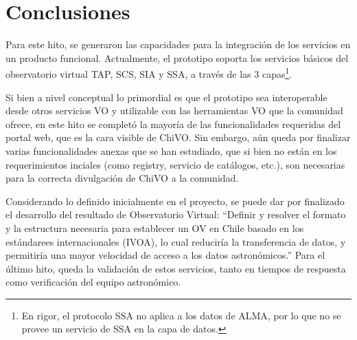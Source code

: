 \section{Conclusiones}

Para este hito, se generaron las capacidades para la integración
de los servicios en un producto funcional. 
Actualmente, el prototipo soporta los servicios básicos
del observatorio virtual TAP, SCS, SIA y SSA, a través de las 3
capas\footnote{En rigor, el protocolo SSA no aplica a los datos de ALMA, por lo
que no se provee un servicio de SSA en la capa de datos.}.

Si bien a nivel conceptual
lo primordial es que el prototipo sea interoperable desde otros servicios VO y
utilizable con las herramientas VO que la comunidad ofrece, en este hito
se completó la mayoría de las funcionalidades requeridas del portal web, 
que es la cara visible de ChiVO. Sin embargo, aún queda por finalizar varias 
funcionalidades anexas que se han estudiado, que si bien no están en 
los requerimientos inciales (como registry, servicio de catálogos, etc.), 
son necesarias para la correcta divulgación de ChiVO a la comunidad.

Considerando lo definido inicialmente en el proyecto, se puede dar por finalizado
el desarrollo del resultado de Observatorio Virtual: ``Definir y resolver el
formato y la estructura necesaria para establecer un OV en Chile basado
en los estándarees internacionales (IVOA), lo cual reduciría la transferencia de
datos, y permitiría una mayor velocidad de acceso a los datos astronómicos.''
Para el último hito, queda la validación de estos servicios, tanto en tiempos
de respuesta como verificación del equipo astronómico.

